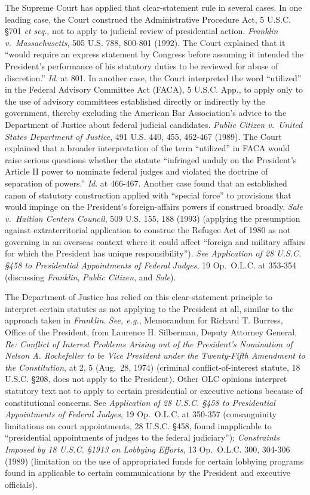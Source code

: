 The Supreme Court has applied that clear-statement rule in several cases.
In one leading case, the Court construed the Administrative Procedure Act, 5 U.S.C. \S 701 \textit{et seq}., not to apply to judicial review of presidential action.
\textit{Franklin v.\ Massachusetts}, 505 U.S. 788, 800-801 (1992).
The Court explained that it “would require an express statement by Congress before assuming it intended the President’s performance of his statutory duties to be reviewed for abuse of discretion.”
\textit{Id}. at 801.
In another case, the Court interpreted the word “utilized” in the Federal Advisory Committee Act (FACA), 5 U.S.C. App., to apply only to the use of advisory committees established directly or indirectly by the government, thereby excluding the American Bar Association’s advice to the Department of Justice about federal judicial candidates.
\textit{Public Citizen v.\ United States Department of Justice}, 491 U.S. 440, 455, 462-467 (1989).
The Court explained that a broader interpretation of the term “utilized” in FACA would raise serious questions whether the statute “infringed unduly on the President’s Article II power to nominate federal judges and violated the doctrine of separation of powers.”
\textit{Id}. at 466-467.
Another case found that an established canon of statutory construction applied with “special force” to provisions that would impinge on the President’s foreign-affairs powers if construed broadly.
\textit{Sale v.\ Haitian Centers Council}, 509 U.S. 155, 188 (1993) (applying the presumption against extraterritorial application to construe the Refugee Act of 1980 as not governing in an overseas context where it could affect “foreign and military affairs for which the President has unique responsibility”).
\textit{See Application of 28 U.S.C. \S 458 to Presidential Appointments of Federal Judges}, 19 Op.\ O.L.C. at 353-354 (discussing \textit{Franklin}, \textit{Public Citizen}, and \textit{Sale}).

The Department of Justice has relied on this clear-statement principle to interpret certain statutes as not applying to the President at all, similar to the approach taken in \textit{Franklin}.
\textit{See, e.g.}, Memorandum for Richard T. Burress, Office of the President, from Laurence H. Silberman, Deputy Attorney General, \textit{Re: Conflict of Interest Problems Arising out of the President's Nomination of Nelson A. Rockefeller to be Vice President under the Twenty-Fifth Amendment to the Constitution}, at 2, 5 (Aug.~28, 1974) (criminal conflict-of-interest statute, 18 U.S.C. \S 208, does not apply to the President).
Other OLC opinions interpret statutory text not to apply to certain presidential or executive actions because of constitutional concerns.
See \textit{Application of 28 U.S.C. \S 458 to Presidential Appointments of Federal Judges}, 19 Op.\ O.L.C. at 350-357 (consanguinity limitations on court appointments, 28 U.S.C. \S 458, found inapplicable to “presidential appointments of judges to the federal judiciary”);
\textit{Constraints Imposed by 18 U.S.C. \S 1913 on Lobbying Efforts}, 13 Op.\ O.L.C. 300, 304-306 (1989) (limitation on the use of appropriated funds for certain lobbying programs found in applicable to certain communications by the President and executive officials).

